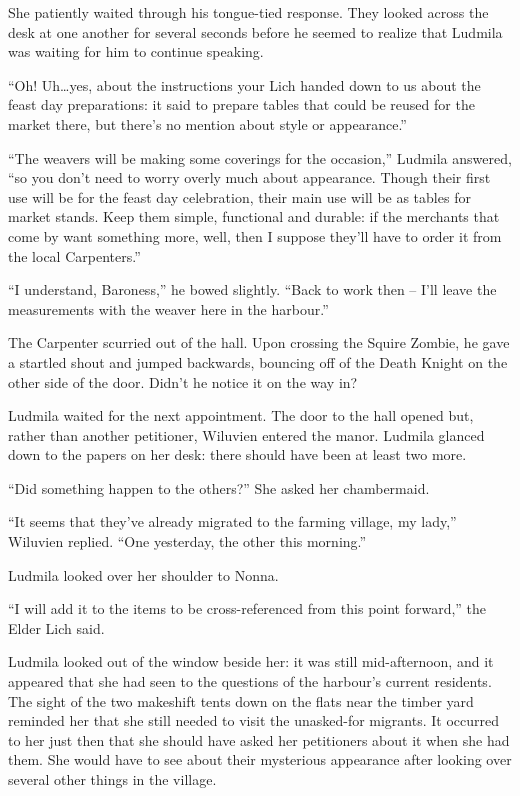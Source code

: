 She patiently waited through his tongue-tied response. They looked across the desk at one another for several seconds before he seemed to realize that Ludmila was waiting for him to continue speaking.

 

“Oh! Uh…yes, about the instructions your Lich handed down to us about the feast day preparations: it said to prepare tables that could be reused for the market there, but there’s no mention about style or appearance.”

 

“The weavers will be making some coverings for the occasion,” Ludmila answered, “so you don’t need to worry overly much about appearance. Though their first use will be for the feast day celebration, their main use will be as tables for market stands. Keep them simple, functional and durable: if the merchants that come by want something more, well, then I suppose they’ll have to order it from the local Carpenters.”

 

“I understand, Baroness,” he bowed slightly. “Back to work then – I’ll leave the measurements with the weaver here in the harbour.”

 

The Carpenter scurried out of the hall. Upon crossing the Squire Zombie, he gave a startled shout and jumped backwards, bouncing off of the Death Knight on the other side of the door. Didn’t he notice it on the way in?

 

Ludmila waited for the next appointment. The door to the hall opened but, rather than another petitioner, Wiluvien entered the manor. Ludmila glanced down to the papers on her desk: there should have been at least two more.

 

“Did something happen to the others?” She asked her chambermaid.

 

“It seems that they’ve already migrated to the farming village, my lady,” Wiluvien replied. “One yesterday, the other this morning.”

 

Ludmila looked over her shoulder to Nonna.

 

“I will add it to the items to be cross-referenced from this point forward,” the Elder Lich said.

 

Ludmila looked out of the window beside her: it was still mid-afternoon, and it appeared that she had seen to the questions of the harbour’s current residents. The sight of the two makeshift tents down on the flats near the timber yard reminded her that she still needed to visit the unasked-for migrants. It occurred to her just then that she should have asked her petitioners about it when she had them. She would have to see about their mysterious appearance after looking over several other things in the village.

